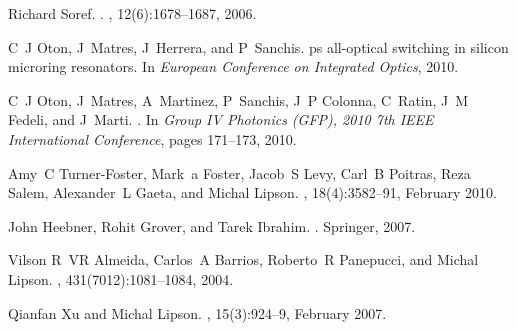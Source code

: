 \begin{thebibliography}{1}

Richard Soref.
.
,
  12(6):1678--1687, 2006.

C~J Oton, J~Matres, J~Herrera, and P~Sanchis.
 ps all-optical switching in silicon microring resonators.
\newblock In {\em European Conference on Integrated Optics}, 2010.

C~J Oton, J~Matres, A~Martinez, P~Sanchis, J~P Colonna, C~Ratin, J~M Fedeli,
  and J~Marti.
.
\newblock In {\em Group IV Photonics (GFP), 2010 7th IEEE International
  Conference}, pages 171--173, 2010.

Amy~C Turner-Foster, Mark~a Foster, Jacob~S Levy, Carl~B Poitras, Reza Salem,
  Alexander~L Gaeta, and Michal Lipson.
, 18(4):3582--91, February 2010.

John Heebner, Rohit Grover, and Tarek Ibrahim.
.
\newblock Springer, 2007.

Vilson R~VR Almeida, Carlos~A Barrios, Roberto~R Panepucci, and Michal Lipson.
, 431(7012):1081--1084, 2004.

Qianfan Xu and Michal Lipson.
, 15(3):924--9, February 2007.

\end{thebibliography}
